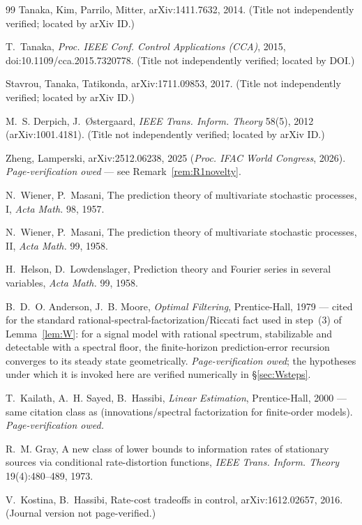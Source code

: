 \documentclass[11pt]{article}
\theoremstyle{definition}
\theoremstyle{remark}
\begin{document}
\begin{thebibliography}{99}
 Tanaka, Kim, Parrilo, Mitter, arXiv:1411.7632,
2014. (Title not independently verified; located by arXiv ID.)

 T.~Tanaka, \emph{Proc. IEEE Conf. Control
Applications (CCA)}, 2015, doi:10.1109/cca.2015.7320778. (Title not
independently verified; located by DOI.)

 Stavrou, Tanaka, Tatikonda, arXiv:1711.09853,
2017. (Title not independently verified; located by arXiv ID.)

 M.~S. Derpich, J.~{\O}stergaard, \emph{IEEE Trans.
Inform. Theory} 58(5), 2012 (arXiv:1001.4181). (Title not
independently verified; located by arXiv ID.)

 Zheng, Lamperski, arXiv:2512.06238, 2025
(\emph{Proc. IFAC World Congress}, 2026). \emph{Page-verification
owed} --- see Remark~\ref{rem:R1novelty}.

 N.~Wiener, P.~Masani, The prediction theory of
multivariate stochastic processes, I, \emph{Acta Math.} 98, 1957.

 N.~Wiener, P.~Masani, The prediction theory of
multivariate stochastic processes, II, \emph{Acta Math.} 99, 1958.

 H.~Helson, D.~Lowdenslager, Prediction theory and
Fourier series in several variables, \emph{Acta Math.} 99, 1958.

 B.~D.~O. Anderson, J.~B. Moore, \emph{Optimal
Filtering}, Prentice-Hall, 1979 --- cited for the standard
rational-spectral-factorization/Riccati fact used in step~(3) of
Lemma~\ref{lem:W}: for a signal model with rational spectrum,
stabilizable and detectable with a spectral floor, the finite-horizon
prediction-error recursion converges to its steady state geometrically.
\emph{Page-verification owed}; the hypotheses under which it is invoked
here are verified numerically in \S\ref{sec:Wsteps}.

 T.~Kailath, A.~H. Sayed, B.~Hassibi, \emph{Linear
Estimation}, Prentice-Hall, 2000 --- same citation class as
\cite{bib:am79} (innovations/spectral factorization for finite-order
models). \emph{Page-verification owed.}

 R.~M. Gray, A new class of lower bounds to
information rates of stationary sources via conditional
rate-distortion functions, \emph{IEEE Trans. Inform. Theory}
19(4):480--489, 1973.

 V.~Kostina, B.~Hassibi, Rate-cost tradeoffs in
control, arXiv:1612.02657, 2016. (Journal version not
page-verified.)


\end{thebibliography}
\end{document}
